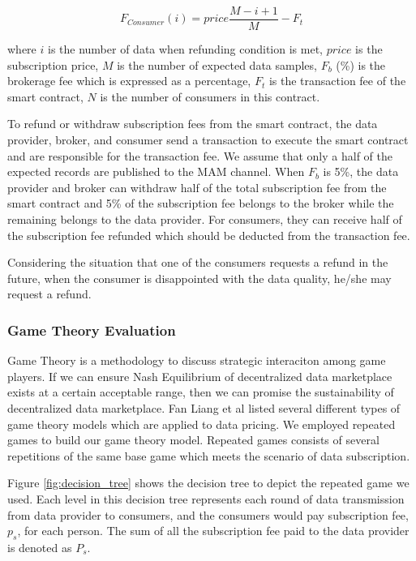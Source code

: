 \documentclass[journal,article,applsci,submit,moreauthors,pdftex]{Definitions/mdpi}
\begin{document}
\begin{equation}
    F_{Consumer}(i) = price \frac{M-i+1}{M} -F_{t}
\end{equation}

where $i$ is the number of data when refunding condition is met, $price$  is the subscription price, $M$ is the number of expected data samples, $F_{b}$ (\%) is the brokerage fee which is expressed as a percentage, $F_{t}$ is the transaction fee of the smart contract, $N$ is the number of consumers in this contract.

To refund or withdraw subscription fees from the smart contract, the data provider, broker, and consumer send a transaction to execute the smart contract and are responsible for the transaction fee. We assume that only a half of the expected records are published to the MAM channel. When $F_{b}$ is 5\%, the data provider and broker can withdraw half of the total subscription fee from the smart contract and 5\% of the subscription fee belongs to the broker while the remaining belongs to the data provider. For consumers, they can receive half of the subscription fee refunded which should be deducted from the transaction fee.

Considering the situation that one of the consumers requests a refund in the future, when the consumer is disappointed with the data quality, he/she may request a refund.

\subsubsection{Game Theory Evaluation}
Game Theory is a methodology to discuss strategic interaciton among game players. If we can ensure Nash Equilibrium of decentralized data marketplace exists at a certain acceptable range, then we can promise the sustainability of decentralized data marketplace. Fan Liang et al\cite{SurveyBigDataPricing} listed several different types of game theory models which are applied to data pricing. We employed repeated games to build our game theory model. Repeated games consists of several repetitions of the same base game which meets the scenario of data subscription.

Figure \ref{fig:decision_tree} shows the decision tree to depict the repeated game we used. Each level in this decision tree represents each round of data transmission from data provider to consumers, and the consumers would pay subscription fee, $p_s$, for each person. The sum of all the subscription fee paid to the data provider is denoted as $P_s$.
\end{document}
